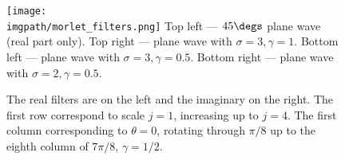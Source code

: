   \begin{figure}
    \begin{center}
      \texttt{[image: \\imgpath/morlet\_filters.png]}
              {Top left --- $45\degs$ plane wave (real part only). Top right --- plane wave with
              $\sigma=3,\gamma=1$. Bottom left --- plane wave with $\sigma=3,\gamma=0.5$. Bottom
            right --- plane wave with $\sigma=2,\gamma=0.5$.}
      \label{fig:ch2:morlet_filters}
    \end{center}
  \end{figure}
  \begin{figure}
    \begin{center}
              {The real filters are on the left and the imaginary on the right. The first row
              correspond to scale $j=1$, increasing up to $j=4$. The first column corresponding to
            $\theta = 0$, rotating through $\pi/8$ up to the eighth column of $7\pi/8$,
          $\gamma=1/2$.} 
      \label{fig:ch2:morlet_wavelets_full}
    \end{center}
  \end{figure}

